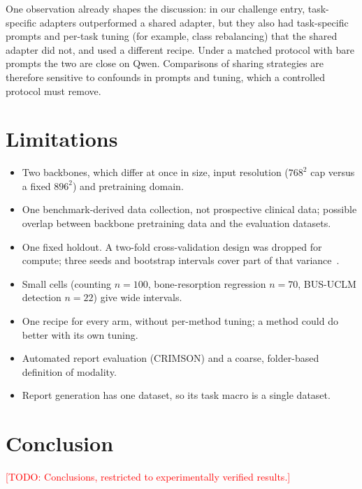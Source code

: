 \documentclass[journal,twoside,web]{ieeecolor}
\newcommand{\todo}[1]{\textcolor{red}{[TODO: #1]}}
\begin{document}
One observation already shapes the discussion: in our challenge entry,
task-specific adapters outperformed a shared adapter, but they also had
task-specific prompts and per-task tuning (for example, class rebalancing)
that the shared adapter did not, and used a different recipe. Under a
matched protocol with bare prompts the two are close on Qwen. Comparisons of sharing strategies are
therefore sensitive to confounds in prompts and tuning, which a controlled
protocol must remove.


\section{Limitations}
\label{sec:limitations}

\begin{itemize}
    \item Two backbones, which differ at once in size, input resolution
    ($768^2$ cap versus a fixed $896^2$) and pretraining domain.
    \item One benchmark-derived data collection, not prospective clinical
    data; possible overlap between backbone pretraining data and the
    evaluation datasets.
    \item One fixed holdout. A two-fold cross-validation design was dropped
    for compute; three seeds and bootstrap intervals cover part of that
    variance~\cite{bradshaw2023crossvalidation}.
    \item Small cells (counting $n=100$, bone-resorption regression $n=70$,
    BUS-UCLM detection $n=22$) give wide intervals.
    \item One recipe for every arm, without per-method tuning; a method
    could do better with its own tuning.
    \item Automated report evaluation (CRIMSON) and a coarse, folder-based
    definition of modality.
    \item Report generation has one dataset, so its task macro is a single
    dataset.
\end{itemize}


\section{Conclusion}
\label{sec:conclusion}

\todo{Conclusions, restricted to experimentally verified results.}
\end{document}
